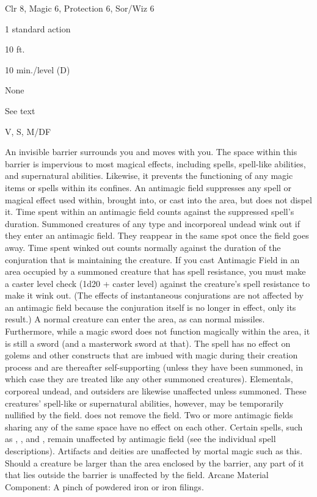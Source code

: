
\begin{description*}
\item[Level:] Clr 8, Magic 6, Protection 6, Sor/Wiz 6
\item[Casting Time:] 1 standard action
\item[Range:] 10 ft.
\item[Duration:] 10 min./level (D)
\item[Saving Throw:] None
\item[Spell Resistance:] See text
\item[Components:] V, S, M/DF
\end{description*}

An invisible barrier surrounds you and moves with you. The space within this barrier
is impervious to most magical effects, including spells, spell-like abilities,
and supernatural abilities. Likewise, it prevents the functioning of any magic
items or spells within its confines.
An antimagic field suppresses any spell or magical effect used within,
brought into, or cast into the area, but does not dispel it. Time spent within
an antimagic field counts against the suppressed spell's duration.
Summoned creatures of any type and incorporeal undead wink out if they enter an
antimagic field. They reappear in the same spot once the field goes away.
Time spent winked out counts normally against the duration of the conjuration that
is maintaining the creature. If you cast Antimagic Field in an area occupied
by a summoned creature that has spell resistance, you must make a caster level
check (1d20 + caster level) against the creature's spell resistance to make it
wink out. (The effects of instantaneous conjurations are not affected
by an antimagic field because the conjuration itself is no longer in effect,
only its result.)
A normal creature can enter the area, as can normal missiles. Furthermore, while
a magic sword does not function magically within the area, it is still a sword
(and a masterwork sword at that). The spell has no effect on golems and other constructs
that are imbued with magic during their creation process and are thereafter self-supporting
(unless they have been summoned, in which case they are treated like any other
summoned creatures). Elementals, corporeal undead, and outsiders are likewise unaffected
unless summoned. These creatures' spell-like or supernatural abilities, however,
may be temporarily nullified by the field.  does not remove
the field.
Two or more antimagic fields sharing any of the same space have no effect
on each other. Certain spells, such as , ,
and , remain unaffected by antimagic field (see
the individual spell descriptions). Artifacts and deities are unaffected by mortal
magic such as this.
Should a creature be larger than the area enclosed by the barrier, any part of
it that lies outside the barrier is unaffected by the field.
Arcane Material Component: A pinch of powdered iron or iron filings.